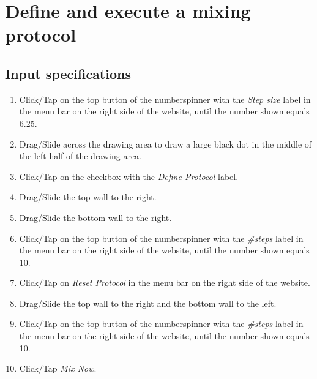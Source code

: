 \section{Define and execute a mixing protocol}

\subsection*{Input specifications}
\begin{enumerate}
\item Click/Tap on the top button of the numberspinner with the \emph{Step size} label in the menu bar on the right side of the website, until the number shown equals 6.25.
\item Drag/Slide across the drawing area to draw a large black dot in the middle of the left half of the drawing area.
\item Click/Tap on the checkbox with the \emph{Define Protocol} label.
\item Drag/Slide the top wall to the right.
\item Drag/Slide the bottom wall to the right.
\item Click/Tap on the top button of the numberspinner with the \emph{\#steps} label in the menu bar on the right side of the website, until the number shown equals 10.
\item Click/Tap on \emph{Reset Protocol} in the menu bar on the right side of the website.
\item Drag/Slide the top wall to the right and the bottom wall to the left.
\item Click/Tap on the top button of the numberspinner with the \emph{\#steps} label in the menu bar on the right side of the website, until the number shown equals 10.
\item Click/Tap \emph{Mix Now}.
\end{enumerate}

